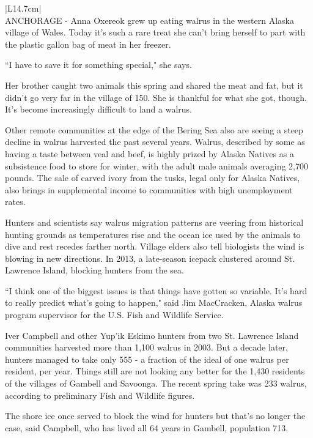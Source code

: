 \begin{table}
\begin{center}
\begin{tabular}{|L{14.7cm}|}\hline
{} \\ \hline
\tiny ANCHORAGE - Anna Oxereok grew up eating walrus in the western Alaska village of Wales. Today it's such a rare treat she can't bring herself to part with the plastic gallon bag of meat in her freezer.

``I have to save it for something special," she says.

Her brother caught two animals this spring and shared the meat and fat, but it didn't go very far in the village of 150. She is thankful for what she got, though. It's become increasingly difficult to land a walrus.

Other remote communities at the edge of the Bering Sea also are seeing a steep decline in walrus harvested the past several years. Walrus, described by some as having a taste between veal and beef, is highly prized by Alaska Natives as a subsistence food to store for winter, with the adult male animals averaging 2,700 pounds. The sale of carved ivory from the tusks, legal only for Alaska Natives, also brings in supplemental income to communities with high unemployment rates.

Hunters and scientists say walrus migration patterns are veering from historical hunting grounds as temperatures rise and the ocean ice used by the animals to dive and rest recedes farther north. Village elders also tell biologists the wind is blowing in new directions. In 2013, a late-season icepack clustered around St. Lawrence Island, blocking hunters from the sea.

``I think one of the biggest issues is that things have gotten so variable. It's hard to really predict what's going to happen," said Jim MacCracken, Alaska walrus program supervisor for the U.S. Fish and Wildlife Service.

Iver Campbell and other Yup'ik Eskimo hunters from two St. Lawrence Island communities harvested more than 1,100 walrus in 2003. But a decade later, hunters managed to take only 555 - a fraction of the ideal of one walrus per resident, per year. Things still are not looking any better for the 1,430 residents of the villages of Gambell and Savoonga. The recent spring take was 233 walrus, according to preliminary Fish and Wildlife figures.

The shore ice once served to block the wind for hunters but that's no longer the case, said Campbell, who has lived all 64 years in Gambell, population 713.


\end{tabular}
\end{center}
\end{table}
